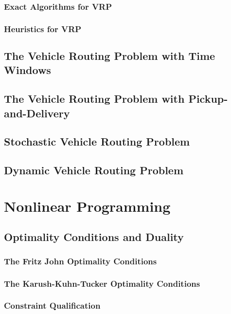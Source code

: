 			\section{Exact Algorithms for VRP}

			\section{Heuristics for VRP}

		\chapter{The Vehicle Routing Problem with Time Windows}

		\chapter{The Vehicle Routing Problem with Pickup-and-Delivery}

		\chapter{Stochastic Vehicle Routing Problem}

		\chapter{Dynamic Vehicle Routing Problem}

	\part{Nonlinear Programming}\label{Nonlinear}
		\chapter{Optimality Conditions and Duality}
			\section{The Fritz John Optimality Conditions}

			\section{The Karush-Kuhn-Tucker Optimality Conditions}

			\section{Constraint Qualification}

